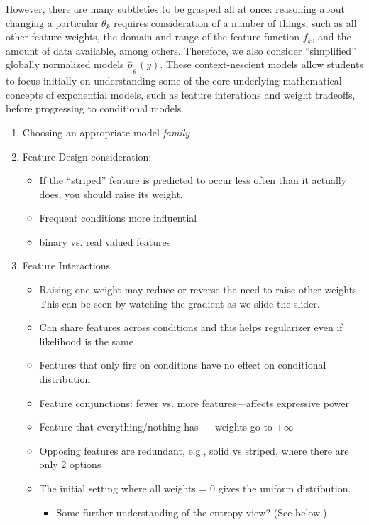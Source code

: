 \documentclass[11pt,letterpaper]{article}
\begin{document}
However, there are many subtleties to be grasped all at once: reasoning about changing a particular $\theta_k$ requires consideration of a number of things, such as all other feature weights, the domain and range of the feature function $f_k$, and the amount of data available, among others. Therefore, we also consider ``simplified'' globally normalized models $\hat{p}_{\vec{\theta}}\left(y\right)$. These context-nescient models allow students to focus initially on understanding some of the core underlying mathematical concepts of exponential models, such as feature interations and weight tradeoffs, before progressing to conditional models.

\begin{enumerate}
\item Choosing an appropriate model \textit{family}%
\item Feature Design consideration:
\begin{itemize}
\item If the “striped” feature is predicted to occur less often than it actually does, you should raise its weight.
\item Frequent conditions more influential
\item binary vs. real valued features
\end{itemize}

\item Feature Interactions
\begin{itemize} 
\item Raising one weight may reduce or reverse the need to raise other weights.  This can be seen by watching the gradient as we slide the slider.
\item Can share features across conditions and this helps regularizer even if likelihood is the same
\item Features that only fire on conditions have no effect on conditional distribution
\item Feature conjunctions: fewer vs. more features---affects expressive power
\item Feature that everything/nothing has --- weights go to $\pm \infty$
\item Opposing features are redundant, e.g., solid vs striped, where there are only 2 options
\item The initial setting where all weights = 0 gives the uniform distribution.
\begin{itemize}
\item Some further understanding of the entropy view?  (See below.)
\end{itemize}
\end{itemize}
\end{enumerate}
\end{document}

